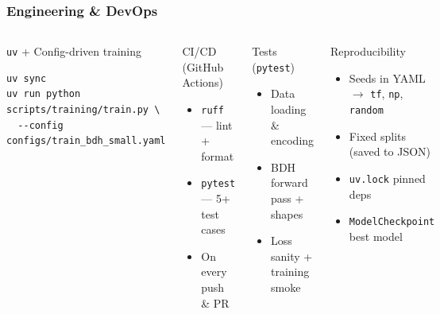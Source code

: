 \documentclass{beamer}
\begin{document}
\begin{frame}[fragile]
\frametitle{Engineering \& DevOps}

\begin{columns}

\begin{block}{\texttt{uv} + Config-driven training}
\scriptsize
\begin{verbatim}
uv sync
uv run python scripts/training/train.py \
  --config configs/train_bdh_small.yaml
\end{verbatim}
\end{block}

\begin{block}{CI/CD (GitHub Actions)}
\footnotesize
\begin{itemize}
    \item \texttt{ruff} --- lint + format
    \item \texttt{pytest} --- 5+ test cases
    \item On every push \& PR
\end{itemize}
\end{block}

\begin{block}{Tests (\texttt{pytest})}
\footnotesize
\begin{itemize}
    \item Data loading \& encoding
    \item BDH forward pass + shapes
    \item Loss sanity + training smoke
\end{itemize}
\end{block}

\column{0.5\textwidth}

\begin{block}{Reproducibility}
\footnotesize
\begin{itemize}
    \item Seeds in YAML $\rightarrow$ \texttt{tf}, \texttt{np}, \texttt{random}
    \item Fixed splits (saved to JSON)
    \item \texttt{uv.lock} pinned deps
    \item \texttt{ModelCheckpoint} best model
\end{itemize}
\end{block}


\end{columns}
\end{frame}
\end{document}

